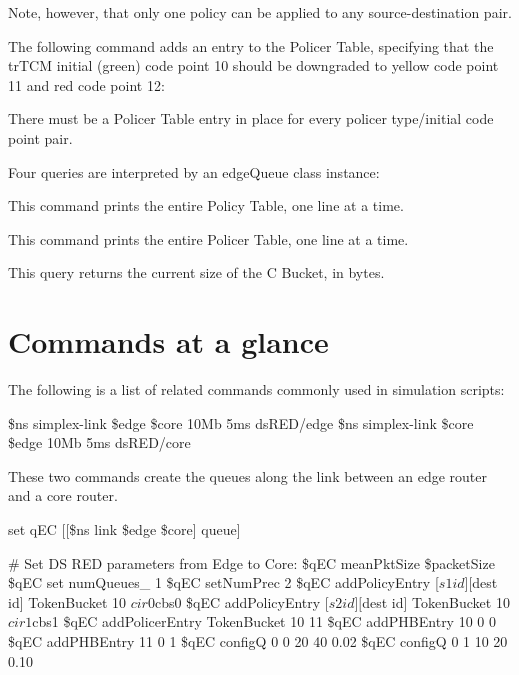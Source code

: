 Note, however, that only one policy can be applied to any source-destination 
pair.

The following command adds an entry to the Policer Table, specifying that the 
trTCM initial (green) code point 10 should be downgraded to yellow code point 
11 and red code point 12:


There must be a Policer Table entry in place for every 
policer type/initial code point pair.

Four queries are interpreted by an edgeQueue class instance:


This command prints the entire Policy Table, one line at a time.


This command prints the entire Policer Table, one line at a time.


This query returns the current size of the C Bucket, in bytes.

\section{Commands at a glance}
\label{sec:diffservcommand}

The following is a list of related commands commonly used in
simulation scripts:

\begin{program}
\$ns simplex-link \$edge \$core 10Mb 5ms dsRED/edge
\$ns simplex-link \$core \$edge 10Mb 5ms dsRED/core
\end{program}

These two commands create the queues along the link between an edge router and 
a core router.

\begin{program}
set qEC [[\$ns link \$edge \$core] queue]

# Set DS RED parameters from Edge to Core:
\$qEC meanPktSize \$packetSize
\$qEC set numQueues_ 1
\$qEC setNumPrec 2
\$qEC addPolicyEntry [$s1 id] [$dest id] TokenBucket 10 $cir0 $cbs0
\$qEC addPolicyEntry [$s2 id] [$dest id] TokenBucket 10 $cir1 $cbs1
\$qEC addPolicerEntry TokenBucket 10 11
\$qEC addPHBEntry 10 0 0
\$qEC addPHBEntry 11 0 1
\$qEC configQ 0 0 20 40 0.02
\$qEC configQ 0 1 10 20 0.10
\end{program}

